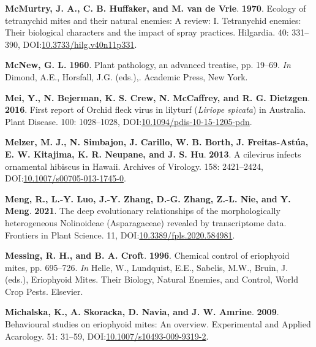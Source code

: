 \documentclass[12pt,final,CPage]{ufthesis}
\newlength{\cslhangindent}
\newenvironment{CSLReferences}[2] %
{%
	\setlength{\parindent}{0pt}
	\ifodd #1 \everypar{\setlength{\hangindent}{\cslhangindent}}\ignorespaces\fi
	\ifnum #2 > 0
	\setlength{\parskip}{#2\baselineskip}
	\fi
}%
{}
\begin{document}
{\begin{CSLReferences}{1}{0}
  \leavevmode{}%
  \textbf{McMurtry, J. A., C. B. Huffaker, and M. van de Vrie}. \textbf{1970}. Ecology of tetranychid mites and their natural enemies: A review: I. Tetranychid enemies: Their biological characters and the impact of spray practices. Hilgardia. 40: 331--390, DOI:\href{https://doi.org/10.3733/hilg.v40n11p331}{10.3733/hilg.v40n11p331}.

  \leavevmode{}%
  \textbf{McNew, G. L.} \textbf{1960}. Plant pathology, an advanced treatise, pp. 19--69. \emph{In} Dimond, A.E., Horsfall, J.G. (eds.),. Academic Press, New York.

  \leavevmode{}%
  \textbf{Mei, Y., N. Bejerman, K. S. Crew, N. McCaffrey, and R. G. Dietzgen}. \textbf{2016}. First report of {Orchid fleck virus} in lilyturf {(\emph{Liriope spicata})} in {Australia}. Plant Disease. 100: 1028--1028, DOI:\href{https://doi.org/10.1094/pdis-10-15-1205-pdn}{10.1094/pdis-10-15-1205-pdn}.

  \leavevmode{}%
  \textbf{Melzer, M. J., N. Simbajon, J. Carillo, W. B. Borth, J. Freitas-Astúa, E. W. Kitajima, K. R. Neupane, and J. S. Hu}. \textbf{2013}. A cilevirus infects ornamental hibiscus in {Hawaii}. Archives of Virology. 158: 2421--2424, DOI:\href{https://doi.org/10.1007/s00705-013-1745-0}{10.1007/s00705-013-1745-0}.

  \leavevmode{}%
  \textbf{Meng, R., L.-Y. Luo, J.-Y. Zhang, D.-G. Zhang, Z.-L. Nie, and Y. Meng}. \textbf{2021}. The deep evolutionary relationships of the morphologically heterogeneous {Nolinoideae} ({Asparagaceae}) revealed by transcriptome data. Frontiers in Plant Science. 11, DOI:\href{https://doi.org/10.3389/fpls.2020.584981}{10.3389/fpls.2020.584981}.

  \leavevmode{}%
  \textbf{Messing, R. H., and B. A. Croft}. \textbf{1996}. Chemical control of eriophyoid mites, pp. 695--726. \emph{In} Helle, W., Lundquist, E.E., Sabelis, M.W., Bruin, J. (eds.), Eriophyoid Mites. Their Biology, Natural Enemies, and Control, World Crop Pests. Elsevier.

  \leavevmode{}%
  \textbf{Michalska, K., A. Skoracka, D. Navia, and J. W. Amrine}. \textbf{2009}. Behavioural studies on eriophyoid mites: An overview. Experimental and Applied Acarology. 51: 31--59, DOI:\href{https://doi.org/10.1007/s10493-009-9319-2}{10.1007/s10493-009-9319-2}.


\end{CSLReferences}}
\end{document}
